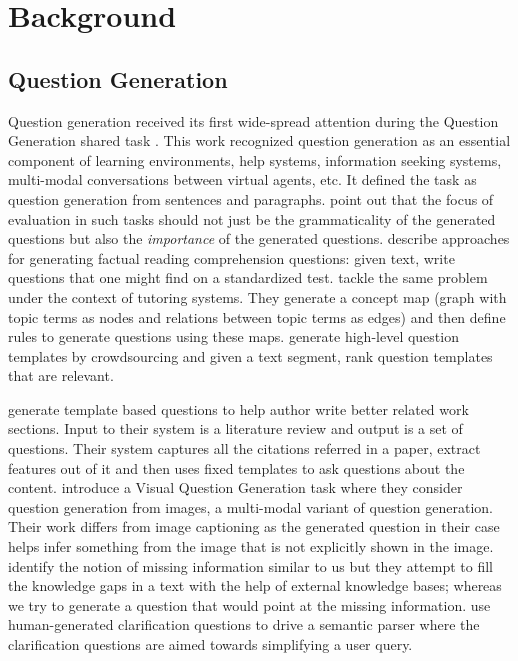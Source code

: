 \documentclass[11pt]{report}
\renewcommand\cite{\citep}	%
\begin{document}
\newpage

\chapter{Background}\label{background}

\section{Question Generation}

Question generation received its first wide-spread attention during the Question Generation shared task \cite{rus2010first,rus2011question}. This work recognized question generation as an essential component of learning environments, help systems, information seeking systems, multi-modal conversations between virtual agents, etc. It defined the task as question generation from sentences and paragraphs. \cite{vanderwende2008importance} point out that the focus of evaluation in such tasks should not just be the grammaticality of the generated questions but also the \textit{importance} of the generated questions.  \cite{heilman2011automatic} describe approaches for generating factual reading comprehension questions: given text, write questions that one might find on a standardized test. \cite{olney2012question} tackle the same problem under the context of tutoring systems. They generate a concept map (graph with topic terms as nodes and relations between topic terms as edges) and then define rules to generate questions using these maps. \cite{labutov2015deep} generate high-level question templates by crowdsourcing and given a text segment, rank question templates that are relevant.

 \cite{liu2010automatic} generate template based questions to help author write better related work sections. Input to their system is a literature review and output is a set of questions. Their system captures all the citations referred in a paper, extract features out of it and then uses fixed templates to ask questions about the content. \cite{mostafazadeh2016generating} introduce a Visual Question Generation task where they consider question generation from images, a multi-modal variant of question generation. Their work differs from image captioning as the generated question in their case helps infer something from the image that is not explicitly shown in the image. \cite{penas2010filling} identify the notion of missing information similar to us but they attempt to fill the knowledge gaps in a text with the help of external knowledge bases; whereas we try to generate a question that would point at the missing information. \cite{artzi2011bootstrapping} use human-generated clarification questions to drive a semantic parser where the clarification questions are aimed towards simplifying a user query.
\end{document}
